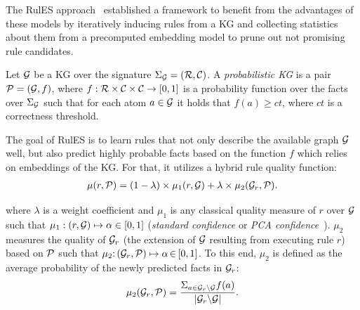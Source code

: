 The RulES approach~\cite{thinh2018} established a framework to benefit from the advantages of these models %
by iteratively inducing rules from a KG and collecting statistics about them from a precomputed embedding model to prune out not promising rule candidates.

Let  $\mathcal{G}$ be a KG over the signature $\Sigma_{\mathcal{G}}=(\mathcal{R},\mathcal{C})$.
A \emph{probabilistic KG} is a pair $\mathcal{P} = (\mathcal{G},f)$, 
where $f:\mathcal{R}\times \mathcal{C} \times \mathcal{C}\rightarrow [0,1]$ is a probability function over the facts over $\Sigma_{\mathcal{G}}$ such that for each atom $a \in \mathcal{G} $ it holds that $f(a) \geq ct $, where $ct$ is a correctness threshold.

The goal of RulES is to learn rules that not only describe the available graph $\mathcal{G}$ well, but also predict highly probable facts based on the function $f$ which relies on embeddings of the KG. For that, it utilizes a hybrid rule quality function:
\begin{align*}
	\mu(r,\mathcal{P})= (1 - \lambda)\times \mu_1(r,\mathcal{G}) + \lambda \times \mu_2(\mathcal{G}_r,\mathcal{P}).
\end{align*}

\noindent where $\lambda$ is a weight coefficient and $\mu_1$ is any classical quality measure of $r$ over $\mathcal{G}$ such that $\mu_1: (r,\mathcal{G}) \mapsto \alpha \in  [0,1]$ (\eg \textit{standard confidence} or \textit{PCA confidence}~\cite{amie}). 
$\mu_2$ measures the quality of $\mathcal{G}_r$ (\ie the extension of $\mathcal{G}$ resulting from executing rule $r$) based on $\mathcal{P}$ such that
 $\mu_2{:}\, (\mathcal{G}_r,\mathcal{P}) \mapsto  \alpha \,{\in}\, [0,1]$. To this end, $\mu_2$ is defined as the average probability of the newly predicted facts in $\mathcal{G}_r$: %
\begin{align*}
	\mu_2(\mathcal{G}_r,\mathcal{P}) = \dfrac{\Sigma_{a\in \mathcal{G}_r\backslash \mathcal{G}} f(a)}{|\mathcal{G}_r \backslash \mathcal{G}|}.
\end{align*}




